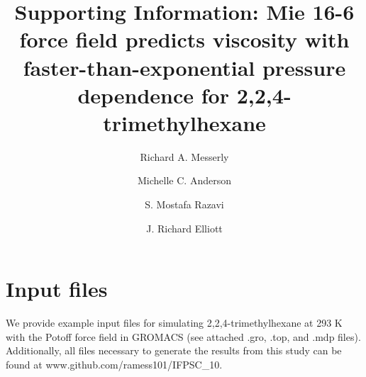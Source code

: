 \documentclass[preprint,review,11pt]{elsarticle}
\begin{document}
	
	\begin{frontmatter}
		
		
		
		\title{Supporting Information: Mie 16-6 force field predicts viscosity with faster-than-exponential pressure dependence for 2,2,4-trimethylhexane}
		
		
		\author{Richard A. Messerly}
		\address{Thermodynamics Research Center, National Institute of Standards and Technology, Boulder, Colorado, 80305}
		
		\author{Michelle C. Anderson}
		\address{Thermodynamics Research Center, National Institute of Standards and Technology, Boulder, Colorado, 80305}
		
		\author{S. Mostafa Razavi}
		\address{Department of Chemical and Biomolecular Engineering, The University of Akron, Akron, Ohio, 44325-3906}
		
		\author{J. Richard Elliott}
		\address{Department of Chemical and Biomolecular Engineering, The University of Akron, Akron, Ohio, 44325-3906}
				
	\end{frontmatter}	
		
	\section{Input files} \label{SI:Gromacs input files}
	
	We provide example input files for simulating 2,2,4-trimethylhexane at 293 K with the Potoff force field in GROMACS (see attached .gro, .top, and .mdp files). Additionally, all files necessary to generate the results from this study can be found at \newline www.github.com/ramess101/IFPSC\_10.
	
\end{document}
